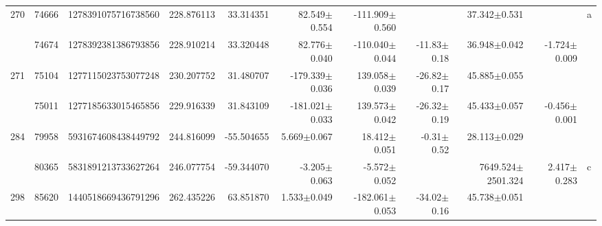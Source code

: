 \documentclass{ws-ijmpd}
\begin{document}
\begin{landscape}
\begin{longtable}{rrrrrrrrrrl}
 \hline 270 &   74666 &      1278391075716738560 &                   228.876113 &                    33.314351 &                 82.549$\pm$0.554 &               -111.909$\pm$0.560 &                           &        37.342$\pm$0.531 &                                           &                                                  a \\
            &   74674 &      1278392381386793856 &                   228.910214 &                    33.320448 &                 82.776$\pm$0.040 &               -110.040$\pm$0.044 &         -11.83$\pm$  0.18 &        36.948$\pm$0.042 &                          -1.724$\pm$0.009 &                                                    \\
 \hline 271 &   75104 &      1277115023753077248 &                   230.207752 &                    31.480707 &               -179.339$\pm$0.036 &                139.058$\pm$0.039 &         -26.82$\pm$  0.17 &        45.885$\pm$0.055 &                                           &                                                    \\
            &   75011 &      1277185633015465856 &                   229.916339 &                    31.843109 &               -181.021$\pm$0.033 &                139.573$\pm$0.042 &         -26.32$\pm$  0.19 &        45.433$\pm$0.057 &                          -0.456$\pm$0.001 &                                                    \\
 \hline 284 &   79958 &      5931674608438449792 &                   244.816099 &                   -55.504655 &                  5.669$\pm$0.067 &                 18.412$\pm$0.051 &          -0.31$\pm$  0.52 &        28.113$\pm$0.029 &                                           &                                                    \\
            &   80365 &      5831891213733627264 &                   246.077754 &                   -59.344070 &                 -3.205$\pm$0.063 &                 -5.572$\pm$0.052 &                           &   7649.524$\pm$2501.324 &                           2.417$\pm$0.283 &                                                  c \\
 \hline 298 &   85620 &      1440518669436791296 &                   262.435226 &                    63.851870 &                  1.533$\pm$0.049 &               -182.061$\pm$0.053 &         -34.02$\pm$  0.16 &        45.738$\pm$0.051 &                                           &                                                    \\

\end{longtable}
\end{landscape}
\end{document}
